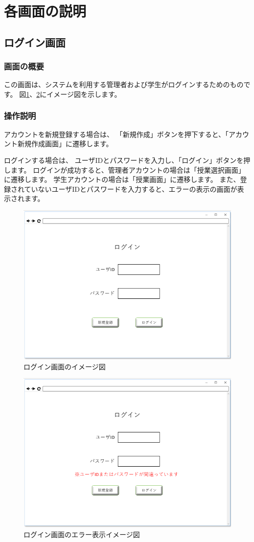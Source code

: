 \section{各画面の説明}
\subsection{ログイン画面}
\subsubsection{画面の概要}
この画面は、システムを利用する管理者および学生がログインするためのものです。
図\ref{fig:01}、\ref{fig:02}にイメージ図を示します。

\subsubsection{操作説明}
アカウントを新規登録する場合は、
「新規作成」ボタンを押下すると、「アカウント新規作成画面」に遷移します。

ログインする場合は、
ユーザIDとパスワードを入力し、「ログイン」ボタンを押します。
ログインが成功すると、管理者アカウントの場合は「授業選択画面」に遷移します。
学生アカウントの場合は「授業画面」に遷移します。
また、登録されていないユーザIDとパスワードを入力すると、エラーの表示の画面が表示されます。

\newpage
\begin{figure}[phtbp]
  \begin{center}
    \includegraphics[width=0.6\linewidth,clip]{./img/01.png}
    \caption{ログイン画面のイメージ図}\label{fig:01}
  \end{center}
\end{figure}

\begin{figure}[phtbp]
  \begin{center}
    \includegraphics[width=0.6\linewidth,clip]{./img/02.png}
    \caption{ログイン画面のエラー表示イメージ図}\label{fig:02}
  \end{center}
\end{figure}

